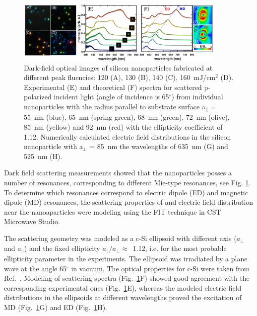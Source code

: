         \begin{figure}[!ht]
                \begin{center}
                    \includegraphics[width=0.9\textwidth]{figs/results/char/DarkField.eps}
                \end{center}
                \caption{Dark-field optical images of silicon nanoparticles fabricated at different peak fluencies:
                120 (A), 130 (B), 140 (C), 160~mJ/cm$^{2}$ (D). Experimental (E) and theoretical (F) spectra for
                scattered p-polarized incident light (angle of incidence is 65$^{\circ}$) from individual nanoparticles
                with the radius parallel to substrate surface a$_{\parallel}$ = 55~nm (blue), 65~nm (spring green),
                68~nm (green), 72~nm (olive), 85~nm (yellow) and 92~nm (red) with the ellipticity coefficient of 1.12.
                Numerically calculated electric field distributions in the silicon nanoparticle with a$_{\perp}$ = 85~nm
                 the wavelengths of 635~nm (G) and 525~nm (H).}
                \label{fig:Darkfield}
        \end{figure}

            Dark field scattering measurements showed that the nanoparticles posses a number of resonances, corresponding to different
        Mie-type resonances, see Fig. \ref{fig:Darkfield}. To determine which resonances correspond to electric dipole (ED) and
        magnetic dipole (MD) resonances, the scattering properties of and electric field distribution near the nanoaparticles were
        modeling using the FIT technique in CST Microwave Studio.

            The scattering geometry was modeled as a c-Si ellipsoid with different axis
        ($a_{\perp}$ and $a_{||}$) and the fixed ellipticity $a_{\parallel}/a_{\perp}\approx$~1.12, i.e. for
        the most probable ellipticity parameter in the experiments. The ellipsoid was irradiated by a plane wave
        at the angle 65$^{\circ}$ in vacuum. The optical properties for
        c-Si were taken from Ref.~\cite{vuye1993temperature}. Modeling of scattering spectra (Fig.~\ref{fig:Darkfield}F) showed good agreement
        with the corresponding experimental ones (Fig.~\ref{fig:Darkfield}E), whereas the modeled electric field distributions
        in the ellipsoids at different wavelengths proved the excitation of MD (Fig.~\ref{fig:Darkfield}G) and ED (Fig.~\ref{fig:Darkfield}H).

